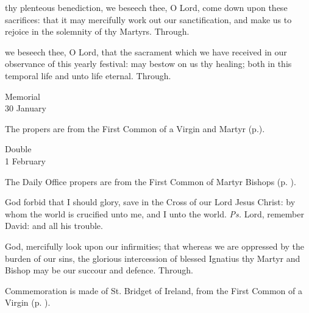 
\secret\label{AgnesSecretII}
 thy plenteous benediction, we beseech thee, O Lord, come down upon these sacrifices: that it may mercifully work out our sanctification, and make us to rejoice in the solemnity of thy Martyrs. Through.


\postcommunion\label{AgnesPostcommunionII}
 we beseech thee, O Lord, that the sacrament which we have received in our observance of this yearly festival: may bestow on us thy healing; both in this temporal life and unto life eternal. Through.


\begin{inhead}
    {Memorial\\
30 January}
\end{inhead}

\begin{rubric}
	The propers are from the First Common of a Virgin and Martyr (p.\pageref{CommonVirginMartyrI}).
\end{rubric}


\begin{inhead}
    {Double\\
1 February}
\end{inhead}

\begin{rubric}
	The Daily Office propers are from the First Common of Martyr Bishops (p. \pageref{CommonMartyrBishopI}).
\end{rubric}

\introit
{} God forbid that I should glory, save in the Cross of our Lord Jesus Christ: by whom the world is crucified unto me, and I unto the world. \textit{Ps.} Lord, remember David: and all his trouble.

\collect
{} God, mercifully look upon our infirmities; that whereas we are oppressed by the burden of our sins, the glorious intercession of blessed Ignatius thy Martyr and Bishop may be our succour and defence. Through.

\begin{rubric}
    Commemoration is made of St. Bridget of Ireland, from the First Common of a Virgin (p. \pageref{CommonVirginOnlyI}).
\end{rubric}

